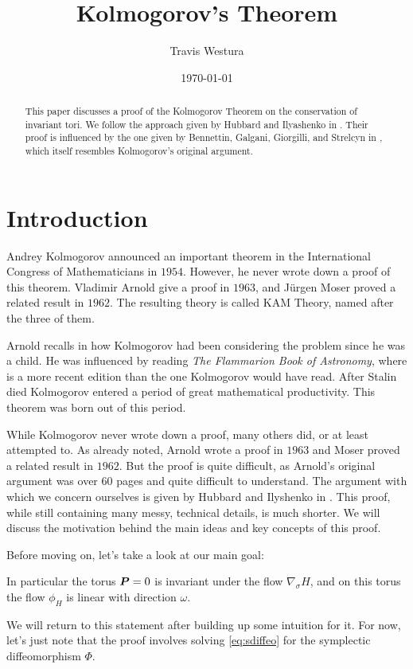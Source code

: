 \documentclass[twoside,letterpaper,10pt]{article}
\title{Kolmogorov's Theorem}
\author{Travis Westura}
\date{\today}
\newcommand{\sgrad}{\nabla_{\sigma}}
\numberwithin{equation}{section}
\begin{document}
\maketitle

\begin{abstract}
  This paper discusses a proof of the Kolmogorov Theorem on the conservation of
  invariant tori.
  We follow the approach given by Hubbard and Ilyashenko in \cite{hi02}.
  Their proof is influenced by the one given by Bennettin, Galgani, Giorgilli,
  and Strelcyn in \cite{bggs84}, which itself resembles Kolmogorov's original
  argument.
\end{abstract}

\section{Introduction}
\label{sec:introduction}

Andrey Kolmogorov announced an important theorem in the International Congress
of Mathematicians in $1954$.
However, he never wrote down a proof of this theorem.
Vladimir Arnold give a proof in $1963$, and J{\"u}rgen Moser proved a related
result in $1962$.
The resulting theory is called KAM Theory, named after the three of them.

Arnold recalls in \cite{a97} how Kolmogorov had been considering the problem
since he was a child.
He was influenced by reading \emph{The Flammarion Book of Astronomy}, where
\cite{f64} is a more recent edition than the one Kolmogorov would have read.
After Stalin died Kolmogorov entered a period of great mathematical
productivity.
This theorem was born out of this period.

While Kolmogorov never wrote down a proof, many others did, or at least
attempted to.
As already noted, Arnold wrote a proof in $1963$ and Moser proved a related
result in $1962$.
But the proof is quite difficult, as Arnold's original argument was over $60$
pages and quite difficult to understand.
The argument with which we concern ourselves is given by Hubbard and Ilyshenko
in \cite{hi02}.
This proof, while still containing many messy, technical details, is much
shorter.
We will discuss the motivation behind the main ideas and key concepts of this
proof.

Before moving on, let's take a look at our main goal:
\begin{thm}
  \label{thm:KAM}
  \KAM{} In particular the torus $\bm{P} = 0$ is invariant under the flow
  $\sgrad H$, and on this torus the flow $\phi_H$ is linear with direction
  $\omega$.
\end{thm}
We will return to this statement after building up some intuition for it.
For now, let's just note that the proof involves solving \cref{eq:sdiffeo} for
the symplectic diffeomorphism $\Phi$.
\end{document}
